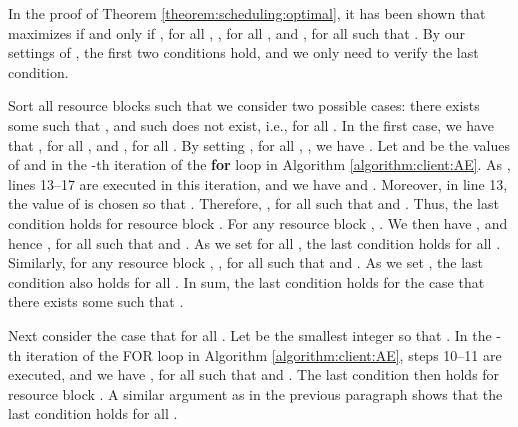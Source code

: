\documentclass[conference]{IEEEtran}
\begin{document}
In the proof of Theorem \ref{theorem:scheduling:optimal}, it has been shown that  maximizes  if and only if , for all , , for all , and , for all  such that . By our settings of , the first two conditions hold, and we only need to verify the last condition.

Sort all resource blocks such that  we consider two possible cases: there exists some  such that , and such  does not exist, i.e.,  for all . In the first case, we have
that , for all , and , for all . By setting , for all , , we have . Let  and  be the values of  and  in the -th iteration of the \textbf{for} loop in Algorithm \ref{algorithm:client:AE}. As , lines 13--17 are executed in this iteration, and we have  and . Moreover, in line 13, the value of  is chosen so that .
Therefore, ,
for all  such that  and . Thus, the last condition holds for resource block . For any resource block , . We then have
,
and hence , for all  such that  and . As we set  for all , the last condition holds for all . Similarly, for any resource block , , for all  such that  and . As we set , the last condition also holds for all . In sum, the last condition holds for the case that there exists some  such that .

Next consider the case that  for all . Let  be the smallest integer so that . In the -th iteration of the FOR loop in Algorithm \ref{algorithm:client:AE}, steps 10--11 are executed, and we have
,
for all  such that  and . The last condition
then holds for resource block . A similar argument as in the previous
paragraph shows that the last condition holds for all .

\vfill 
\end{document}

